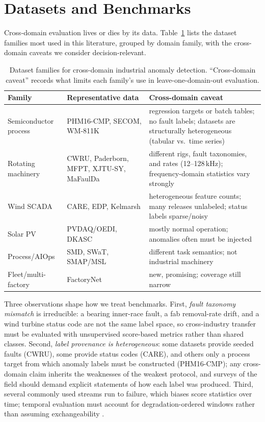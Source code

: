 \section{Datasets and Benchmarks}
\label{sec:datasets}

Cross-domain evaluation lives or dies by its data. Table~\ref{tab:survey-data} lists the dataset families most used in this literature, grouped by domain family, with the cross-domain caveats we consider decision-relevant.

\begin{table}[t]
\caption{Dataset families for cross-domain industrial anomaly detection. ``Cross-domain caveat'' records what limits each family's use in leave-one-domain-out evaluation.}
\label{tab:survey-data}
\centering
\small
\begin{tabular}{p{2.1cm}p{2.6cm}p{3.0cm}}
\toprule
Family & Representative data & Cross-domain caveat \\
\midrule
Semiconductor process & PHM16-CMP, SECOM, WM-811K & regression targets or batch tables; no fault labels; datasets are structurally heterogeneous (tabular vs.\ time series) \\
Rotating machinery & CWRU, Paderborn, MFPT, XJTU-SY, MaFaulDa & different rigs, fault taxonomies, and rates (12--128\,kHz); frequency-domain statistics vary strongly \\
Wind SCADA & CARE, EDP, Kelmarsh & heterogeneous feature counts; many releases unlabeled; status labels sparse/noisy \\
Solar PV & PVDAQ/OEDI, DKASC & mostly normal operation; anomalies often must be injected \\
Process/AIOps & SMD, SWaT, SMAP/MSL & different task semantics; not industrial machinery \\
Fleet/multi-factory & FactoryNet \cite{2605_09081} & new, promising; coverage still narrow \\
\bottomrule
\end{tabular}
\end{table}

Three observations shape how we treat benchmarks. First, \emph{fault taxonomy mismatch} is irreducible: a bearing inner-race fault, a fab removal-rate drift, and a wind turbine status code are not the same label space, so cross-industry transfer must be evaluated with unsupervised score-based metrics rather than shared classes. Second, \emph{label provenance is heterogeneous}: some datasets provide seeded faults (CWRU), some provide status codes (CARE), and others only a process target from which anomaly labels must be constructed (PHM16-CMP); any cross-domain claim inherits the weaknesses of the weakest protocol, and surveys of the field should demand explicit statements of how each label was produced. Third, several commonly used streams run to failure, which biases score statistics over time; temporal evaluation must account for degradation-ordered windows rather than assuming exchangeability \cite{2506_15831,2002_04236}.

